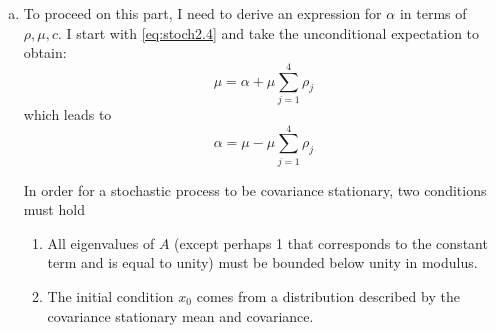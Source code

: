 \documentclass{homework}
\begin{document}
\begin{homeworkProblem}[Problem 2.4]
{\begin{enumerate}[a.]
      \begin{align*}
        \left[\begin{matrix} y_{t+1} \\ y_t \\ y_{t-1} \\ y_{t-2} \\ 1  \end{matrix}\right] &=
        \left[\begin{matrix} \rho_1 &  \rho_2 & \rho_3 & \rho_4 & \alpha \\
        1 &  0 & 0 & 0 & 0 \\
        0 &  1 & 0 & 0 & 0 \\
        0 &  0 & 1 & 0 & 0 \\
        0 &  0 & 0 & 0 & 1 \\
        \end{matrix}\right]
        \left[\begin{matrix} y_{t} \\ y_{t-1} \\ y_{t-2} \\ y_{t-3} \\ 1  \end{matrix}\right] +
        \left[\begin{matrix} c \\  0 \\ 0 \\ 0 \\ 0  \end{matrix}\right] w_{t+1}  \\
        y_{t+1} &= Ay_t + cw_{t+1}
      \end{align*} \qed

      \item To proceed on this part, I need to derive an expression for $\alpha$ in terms of $\rho, \mu, c$. I start with \ref{eq:stoch2.4} and take the unconditional expectation to obtain: $$\mu = \alpha + \mu \sum_{j=1}^4 \rho_j$$ which leads to $$\alpha = \mu - \mu \sum_{j=1}^4 \rho_j$$

        In order for a stochastic process to be covariance stationary, two conditions must hold

        \begin{enumerate}
          \item All eigenvalues of $A$ (except perhaps 1 that corresponds to the constant term and is equal to unity) must be bounded below unity in modulus.
          \item The initial condition $x_0$ comes from a distribution described by the covariance stationary mean and covariance.
        \end{enumerate}


\end{enumerate}}
\end{homeworkProblem}
\end{document}
